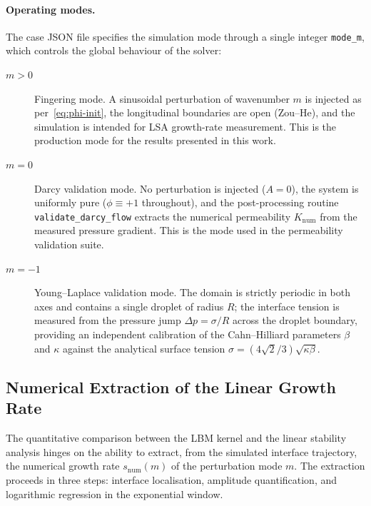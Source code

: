 \paragraph{Operating modes.}
The case JSON file specifies the simulation mode through a single integer \texttt{mode\_m}, which controls the global behaviour of the solver:
\begin{description}
\item[$m > 0$] Fingering mode.
A sinusoidal perturbation of wavenumber $m$ is injected as per~\eqref{eq:phi-init}, the longitudinal boundaries are open (Zou--He), and the simulation is intended for LSA growth-rate measurement.
This is the production mode for the results presented in this work.
\item[$m = 0$] Darcy validation mode.
No perturbation is injected ($A = 0$), the system is uniformly pure ($\phi \equiv +1$ throughout), and the post-processing routine \texttt{validate\_darcy\_flow} extracts the numerical permeability $K_{\mathrm{num}}$ from the measured pressure gradient.
This is the mode used in the permeability validation suite.
\item[$m = -1$] Young--Laplace validation mode.
The domain is strictly periodic in both axes and contains a single droplet of radius $R$;
the interface tension is measured from the pressure jump $\Delta p = \sigma/R$ across the droplet boundary, providing an independent calibration of the Cahn--Hilliard parameters $\beta$ and $\kappa$ against the analytical surface tension $\sigma = (4\sqrt{2}/3)\sqrt{\kappa\beta}$.
\end{description}

\subsection{Numerical Extraction of the Linear Growth Rate}
\label{sec:growth-rate-extraction}

The quantitative comparison between the LBM kernel and the linear stability analysis hinges on the ability to extract, from the simulated interface trajectory, the numerical growth rate $s_{\mathrm{num}}(m)$ of the perturbation mode $m$.
The extraction proceeds in three steps: interface localisation, amplitude quantification, and logarithmic regression in the exponential window.

